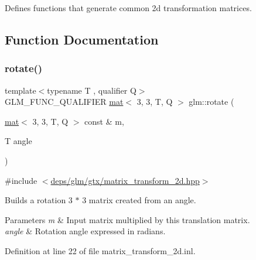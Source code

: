 Defines functions that generate common 2d transformation matrices. 

\subsection{Function Documentation}
\mbox{\label{group__gtx__matrix__transform__2d_gaddca86444c3dee30a0aa07673d68743d}} 
\subsubsection{\texorpdfstring{rotate()}{rotate()}}
{\footnotesize\ttfamily template$<$typename T , qualifier Q$>$ \\
G\+L\+M\+\_\+\+F\+U\+N\+C\+\_\+\+Q\+U\+A\+L\+I\+F\+I\+ER \hyperlink{structglm_1_1mat}{mat}$<$ 3, 3, T, Q $>$ glm\+::rotate (\begin{DoxyParamCaption}\item[{\hyperlink{structglm_1_1mat}{mat}$<$ 3, 3, T, Q $>$ const \&}]{m,  }\item[{T}]{angle }\end{DoxyParamCaption})}



{\ttfamily \#include $<$\hyperlink{matrix__transform__2d_8hpp}{deps/glm/gtx/matrix\+\_\+transform\+\_\+2d.\+hpp}$>$}

Builds a rotation 3 $\ast$ 3 matrix created from an angle.


\begin{DoxyParams}{Parameters}
{\em m} & Input matrix multiplied by this translation matrix. \\
\hline
{\em angle} & Rotation angle expressed in radians. \\
\hline
\end{DoxyParams}


Definition at line 22 of file matrix\+\_\+transform\+\_\+2d.\+inl.

\mbox{\label{group__gtx__matrix__transform__2d_ga6fd2493e8271ee595898e9b3d434c1a7}} 

